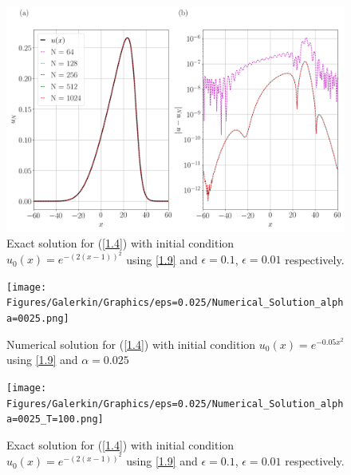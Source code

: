 	\begin{figure}
		\includegraphics[width=\textwidth]{Figures/Galerkin/Graphics/eps=0.5/Numerical_Solution_alpha=05_T=100.png}
		\caption{Exact solution for (\ref{1.4}) with initial condition $u_0 (x) = e^{-(2(x - 1))^2}$ using \ref{1.9} and $\epsilon = 0.1$, $\epsilon = 0.01$ respectively.}
		\label{Exact_Solution}
	\end{figure}
	\begin{figure}
		\texttt{[image: Figures/Galerkin/Graphics/eps=0.025/Numerical\_Solution\_alpha=0025.png]}
		\caption{Numerical solution for (\ref{1.4}) with initial condition $u_0 (x) = e^{- 0.05 x^2}$ using \ref{1.9} and $\alpha = 0.025$}
		\label{Exact_Solution}
	\end{figure}
	\begin{figure}
		\texttt{[image: Figures/Galerkin/Graphics/eps=0.025/Numerical\_Solution\_alpha=0025\_T=100.png]}
		\caption{Exact solution for (\ref{1.4}) with initial condition $u_0 (x) = e^{-(2(x - 1))^2}$ using \ref{1.9} and $\epsilon = 0.1$, $\epsilon = 0.01$ respectively.}
		\label{Exact_Solution}
	\end{figure}
